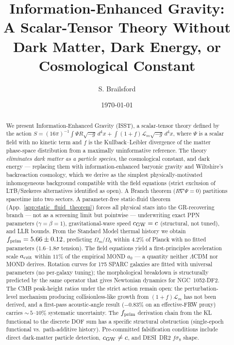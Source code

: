 \documentclass[aps,prd,twocolumn,nofootinbib,floatfix,superscriptaddress]{revtex4-2}
\newcommand{\Lm}{\mathcal{L}_m}
\newcommand{\fprim}{f_{\rm prim}}
\begin{document}
\title{Information-Enhanced Gravity:\\
A Scalar-Tensor Theory Without Dark Matter, Dark Energy, or Cosmological Constant}

\author{S. Brailsford}

\date{\today}

\begin{abstract}
We present Information-Enhanced Gravity (ISST), a scalar-tensor
theory defined by the action
$S = (16\pi)^{-1}\!\int\!\Psi R\sqrt{-g}\,d^4x +
\int\!(1{+}f)\Lm\sqrt{-g}\,d^4x$,
where $\Psi$ is a scalar field with no kinetic term and $f$ is the
Kullback--Leibler divergence of the matter phase-space distribution
from a maximally uninformative reference. The theory
\emph{eliminates dark matter as a particle species}, the
cosmological constant, and dark energy --- replacing them with
information-enhanced baryonic gravity and Wiltshire's backreaction
cosmology, which we derive as the simplest physically-motivated
inhomogeneous background compatible with the field equations
(strict exclusion of LTB/Szekeres alternatives identified as open). A Branch theorem
($R\nabla\Psi = 0$) partitions spacetime into two sectors. A
parameter-free static-fluid theorem
(App.~\ref{app:static_fluid_theorem}) forces all physical stars
into the GR-recovering branch --- not as a screening limit but
pointwise --- underwriting exact PPN parameters
($\gamma = \beta = 1$), gravitational-wave speed $c_{\rm GW} = c$
(structural, not tuned), and LLR bounds. From the Standard Model
thermal history we obtain $\fprim = 5.66 \pm 0.12$, predicting
$\Omega_m/\Omega_b$ within $4.2\%$ of Planck with no fitted
parameters ($1.6$--$1.8\sigma$ tension). The field equations yield
a first-principles acceleration scale $a_{\rm crit}$ within $11\%$
of the empirical MOND $a_0$ --- a quantity neither $\Lambda$CDM nor
MOND derives. Rotation curves for 175 SPARC galaxies are fitted
with universal parameters (no per-galaxy tuning); the morphological
breakdown is structurally predicted by the same operator that gives
Newtonian dynamics for NGC~1052-DF2. The CMB peak-height ratios
under the strict action remain open: the perturbation-level
mechanism producing collisionless-like growth from $(1{+}f)\Lm$
has not been derived, and a first-pass acoustic-angle result
($-0.83\%$ on an effective-FRW proxy) carries
${\sim}\,5$--$10\%$ systematic uncertainty. The $\fprim$ derivation
chain from the KL functional to the discrete DOF sum has a specific
structural obstruction (single-epoch functional vs.\ path-additive
history). Pre-committed falsification conditions include direct
dark-matter particle detection, $c_{\rm GW} \neq c$, and DESI~DR2
$f\sigma_8$ shape.
\end{abstract}
\end{document}
